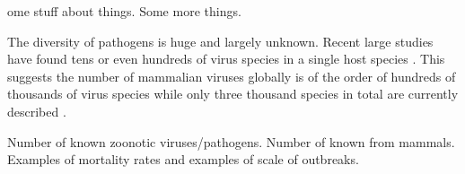 

ome stuff about things. Some more things. 



The diversity of pathogens is huge and largely unknown.
Recent large studies have found tens \cite{anthony2013strategy} or even hundreds of virus species in a single host species \cite{anthony2015non}.
This suggests the number of mammalian viruses globally is of the order of hundreds of thousands of virus species \cite{anthony2013strategy} while only three thousand species in total are currently described \cite{ICTV}.







Number of known zoonotic viruses/pathogens.
Number of known from mammals.
Examples of mortality rates and examples of scale of outbreaks.







